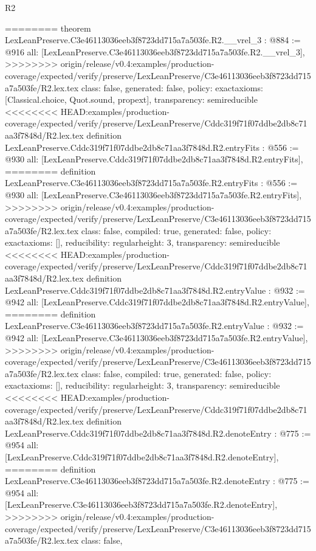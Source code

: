 \begin{lexlean}{R2}
\begin{coremodule}
{{{{{{{{{{{{{{{========
theorem LexLeanPreserve.C3e46113036eeb3f8723dd715a7a503fe.R2.__vrel_3 : @884 := @916 {
  all: [LexLeanPreserve.C3e46113036eeb3f8723dd715a7a503fe.R2.__vrel_3],
>>>>>>>> origin/release/v0.4:examples/production-coverage/expected/verify/preserve/LexLeanPreserve/C3e46113036eeb3f8723dd715a7a503fe/R2.lex.tex
  class: false,
  generated: false,
  policy: exact{axioms: [Classical.choice, Quot.sound, propext]},
  transparency: semireducible
}
<<<<<<<< HEAD:examples/production-coverage/expected/verify/preserve/LexLeanPreserve/Cddc319f71f07ddbe2db8c71aa3f7848d/R2.lex.tex
definition LexLeanPreserve.Cddc319f71f07ddbe2db8c71aa3f7848d.R2.entryFits : @556 := @930 {
  all: [LexLeanPreserve.Cddc319f71f07ddbe2db8c71aa3f7848d.R2.entryFits],
========
definition LexLeanPreserve.C3e46113036eeb3f8723dd715a7a503fe.R2.entryFits : @556 := @930 {
  all: [LexLeanPreserve.C3e46113036eeb3f8723dd715a7a503fe.R2.entryFits],
>>>>>>>> origin/release/v0.4:examples/production-coverage/expected/verify/preserve/LexLeanPreserve/C3e46113036eeb3f8723dd715a7a503fe/R2.lex.tex
  class: false,
  compiled: true,
  generated: false,
  policy: exact{axioms: []},
  reducibility: regular{height: 3},
  transparency: semireducible
}
<<<<<<<< HEAD:examples/production-coverage/expected/verify/preserve/LexLeanPreserve/Cddc319f71f07ddbe2db8c71aa3f7848d/R2.lex.tex
definition LexLeanPreserve.Cddc319f71f07ddbe2db8c71aa3f7848d.R2.entryValue : @932 := @942 {
  all: [LexLeanPreserve.Cddc319f71f07ddbe2db8c71aa3f7848d.R2.entryValue],
========
definition LexLeanPreserve.C3e46113036eeb3f8723dd715a7a503fe.R2.entryValue : @932 := @942 {
  all: [LexLeanPreserve.C3e46113036eeb3f8723dd715a7a503fe.R2.entryValue],
>>>>>>>> origin/release/v0.4:examples/production-coverage/expected/verify/preserve/LexLeanPreserve/C3e46113036eeb3f8723dd715a7a503fe/R2.lex.tex
  class: false,
  compiled: true,
  generated: false,
  policy: exact{axioms: []},
  reducibility: regular{height: 3},
  transparency: semireducible
}
<<<<<<<< HEAD:examples/production-coverage/expected/verify/preserve/LexLeanPreserve/Cddc319f71f07ddbe2db8c71aa3f7848d/R2.lex.tex
definition LexLeanPreserve.Cddc319f71f07ddbe2db8c71aa3f7848d.R2.denoteEntry : @775 := @954 {
  all: [LexLeanPreserve.Cddc319f71f07ddbe2db8c71aa3f7848d.R2.denoteEntry],
========
definition LexLeanPreserve.C3e46113036eeb3f8723dd715a7a503fe.R2.denoteEntry : @775 := @954 {
  all: [LexLeanPreserve.C3e46113036eeb3f8723dd715a7a503fe.R2.denoteEntry],
>>>>>>>> origin/release/v0.4:examples/production-coverage/expected/verify/preserve/LexLeanPreserve/C3e46113036eeb3f8723dd715a7a503fe/R2.lex.tex
  class: false,
}}}}}}}}}}}}}}}}}}}
\end{coremodule}
\end{lexlean}
